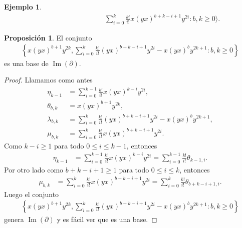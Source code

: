 \documentclass[a4paper,oneside,fleqn,11pt]{report}
\theoremstyle{definition}
\theoremstyle{definition}
\newtheorem{example}{Ejemplo}[section]
\newtheorem{prop}{Proposición}
\numberwithin{prop}{subsection}
\DeclareMathOperator\Ima{Im}
\begin{document}
\begin{example}
\begin{align*}
		&\hspace{100pt}\sum_{i = 0}^k\frac{k!}{i!}x(yx)^{b + k - i + 1}y^{2i} : b,k \geq 0 \Bigg\rangle.
\end{align*}
\begin{prop}
\label{impartial}
El conjunto
\begin{align*}
		\left\{ x(yx)^{b + 1}y^{2k},
			\sum_{i = 0}^k\frac{k!}{i!}(yx)^{b + k - i + 1}y^{2i} - x(yx)^by^{2k + 1} :b, k \geq 0 \right\}
\end{align*}
es una base de $\Ima(\partial)$.
\end{prop}
\begin{proof}
Llamamos como antes
\begin{align*}
	\eta_{k - 1} &=  \sum_{i = 0}^{k-1}\frac{k!}{i!}x(yx)^{k - i}y^{2i}, \\
	\theta_{b,k} &= x(yx)^{b + 1}y^{2k},\\
	\lambda_{b,k} &= \sum_{i = 0}^k\frac{k!}{i!}(yx)^{b + k - i + 1}y^{2i} - x(yx)^by^{2k + 1}, \\
	\mu_{b,k} &= \sum_{i = 0}^k\frac{k!}{i!}x(yx)^{b + k - i + 1}y^{2i}.
\end{align*}
Como $k - i \geq 1$ para todo $0 \leq i \leq k -1$, entonces
\begin{align*}
	\eta_{k - 1} &= \sum_{i = 0}^{k-1}\frac{k!}{i!}x(yx)^{k - i}y^{2i} = \sum_{i = 0}^{k-1}\frac{k!}{i!}\theta_{k-1,i}.
\end{align*}
Por otro lado como $b + k - i + 1 \geq 1$ para todo $0 \leq i \leq k$, entonces
\begin{align*}
	\mu_{b,k} &= \sum_{i = 0}^k\frac{k!}{i!}x(yx)^{b + k - i + 1}y^{2i}
		= \sum_{i = 0}^k\frac{k!}{i!}\theta_{b + k - i + 1, i}.
\end{align*}
Luego el conjunto
\begin{align*}
	\left\{ x(yx)^{b + 1}y^{2k},
		\sum_{i = 0}^k\frac{k!}{i!}(yx)^{b + k - i + 1}y^{2i} - x(yx)^by^{2k + 1} :b,k \geq 0	\right\}
\end{align*}
 genera $\Ima(\partial)$ y es fácil ver que es una base.
\end{proof}


\end{example}
\end{document}
